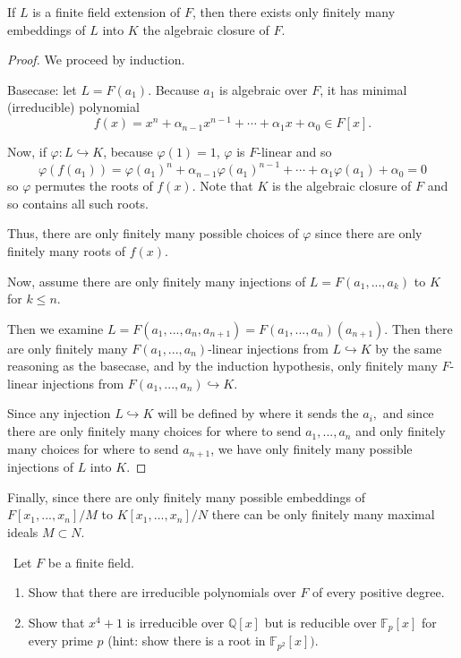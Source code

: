 \documentclass[12pt]{AlgebraQual}
\begin{document}
\begin{solution}
\begin{claim} If $L$ is a finite field extension of $F$, then there exists only finitely many embeddings of $L$ into $K$ the algebraic closure of $F.$
\begin{proof} We proceed by induction.

Basecase: let $L=F(a_1)$. Because $a_1$ is algebraic over $F$, it has minimal (irreducible) polynomial $$f(x)=x^n+\alpha_{n-1}x^{n-1}+\cdots+\alpha_1x+\alpha_0\in F[x].$$

Now, if $\varphi:L\hookrightarrow K$, because $\varphi(1)=1$, $\varphi$ is $F$-linear and so $$\varphi(f(a_1))=\varphi(a_1)^n+\alpha_{n-1}\varphi(a_1)^{n-1}+\cdots+\alpha_1\varphi(a_1)+\alpha_0=0$$ so $\varphi$ permutes the roots of $f(x).$ Note that $K$ is the algebraic closure of $F$ and so contains all such roots.

Thus, there are only finitely many possible choices of $\varphi$ since there are only finitely many roots of $f(x).$

Now, assume there are only finitely many injections of $L=F(a_1,...,a_k)$ to $K$ for $k\le n$.

Then we examine $L=F(a_1,...,a_n,a_{n+1})=F(a_1,...,a_n)(a_{n+1}).$ Then there are only finitely many $F(a_1,...,a_n)$-linear injections from $L\hookrightarrow K$ by the same reasoning as the basecase, and by the induction hypothesis, only finitely many $F$-linear injections from $F(a_1,...,a_n)\hookrightarrow K$.

Since any injection $L\hookrightarrow K$ will be defined by where it sends the $a_i,$ and since there are only finitely many choices for where to send $a_1,...,a_n$ and only finitely many choices for where to send $a_{n+1}$, we have only finitely many possible injections of $L$ into $K.$
\end{proof}
\end{claim}

Finally, since there are only finitely many possible embeddings of $F[x_1,...,x_n]/M$ to $K[x_1,...,x_n]/N$ there can be only finitely many maximal ideals $M\subset N$.
\end{solution}
\newpage


\begin{problem} $\,$
Let $F$ be a finite field.
\begin{enumerate}[label=(\alph*)]
    \item Show that there are irreducible polynomials over $F$ of every positive degree.
    \item Show that $x^4+1$ is irreducible over $\mathbb{Q}[x]$ but is reducible over $\mathbb{F}_p[x]$ for every prime $p$ (hint: show there is a root in $\mathbb{F}_{p^2}[x]).$
\end{enumerate}
\end{problem}
\end{document}
